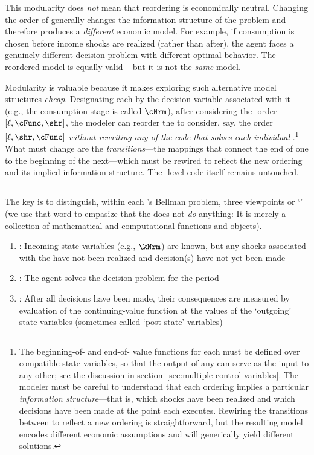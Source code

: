 \documentclass[SolvingMicroDSOPs]{subfiles}
\begin{document}
This modularity does \textit{not} mean that reordering {\stgs} is economically neutral.  Changing the order of {\stgs} generally changes the information structure of the problem and therefore produces a \textit{different} economic model.  For example, if consumption is chosen before income shocks are realized (rather than after), the agent faces a genuinely different decision problem with different optimal behavior.  The reordered model is equally valid -- but it is not the \textit{same} model.

Modularity is valuable because it makes exploring such alternative model structures \textit{cheap}.  Designating each {\stg} by the decision variable associated with it (e.g., the consumption stage is called $\cNrm$), after considering the {\stg}-order $[\ell,\cFunc,\shr]$, the modeler can reorder the {\stgs} to consider, say, the order $[\ell,\shr,\cFunc]$ \textit{without rewriting any of the code that solves each individual {\stg}}.\footnote{The beginning-of-{\stg} and end-of-{\stg} value functions for each {\stg} must be defined over compatible state variables, so that the output of any {\stg} can serve as the input to any other; see the discussion in section~\ref{sec:multiple-control-variables}.  The modeler must be careful to understand that each ordering implies a particular \textit{information structure}---that is, which shocks have been realized and which decisions have been made at the point each {\stg} executes.  Rewiring the transitions between {\stgs} to reflect a new ordering is straightforward, but the resulting model encodes different economic assumptions and will generically yield different solutions.}  What must change are the \textit{transitions}---the mappings that connect the end of one {\stg} to the beginning of the next---which must be rewired to reflect the new ordering and its implied information structure.  The {\stg}-level code itself remains untouched.

\hypertarget{prchs}{}
\subsection{\Prchs}\label{subsec:prchs}

The key is to distinguish, within each {\stg}'s Bellman problem, three viewpoints or `{\prchs}' (we use that word to empasize that the {\prch} does not \textit{do} anything: It is merely a collection of mathematical and computational functions and objects).
\begin{enumerate}
\item \textbf{\Arrival}: Incoming state variables (e.g., $\kNrm$) are known, but any shocks associated with the {\stg} have not been realized and decision(s) have not yet been made
\item \textbf{\Decision}: The agent solves the decision problem for the period
\item \textbf{\Continuation}: After all decisions have been made, their consequences are measured by evaluation of the continuing-value function at the values of the `outgoing' state variables (sometimes called `post-state' variables)
\end{enumerate}
\end{document}
